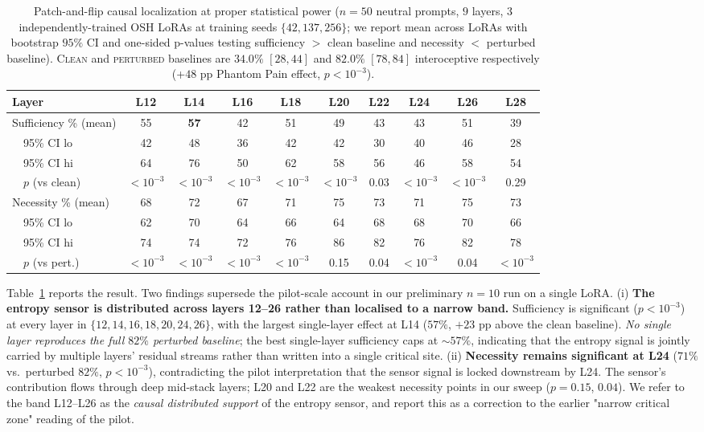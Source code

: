 \documentclass[10pt,letterpaper]{article}
\theoremstyle{definition}
\theoremstyle{plain}
\newcommand{\osh}{\textsc{OSH}}
\begin{document}
\begin{table}[t]
\centering
\caption{Patch-and-flip causal localization at proper statistical power
($n{=}50$ neutral prompts, $9$ layers, $3$ independently-trained
\osh{} LoRAs at training seeds $\{42, 137, 256\}$; we report mean across
LoRAs with bootstrap $95\%$ CI and one-sided p-values testing
sufficiency $>$ clean baseline and necessity $<$ perturbed baseline).
\textsc{Clean} and \textsc{perturbed} baselines are
$34.0\%$ $[28, 44]$ and $82.0\%$ $[78, 84]$ interoceptive
respectively (+$48$ pp Phantom Pain effect, $p < 10^{-3}$).}
\label{tab:patch-flip}
\small
\begin{tabular}{lccccccccc}
\toprule
\textbf{Layer} & L12 & L14 & L16 & L18 & L20 & L22 & L24 & L26 & L28 \\
\midrule
Sufficiency \% (mean)    & 55  & \textbf{57} & 42  & 51  & 49  & 43  & 43  & 51  & 39 \\
$\quad$95\% CI lo  & 42  & 48  & 36  & 42  & 42  & 30  & 40  & 46  & 28 \\
$\quad$95\% CI hi  & 64  & 76  & 50  & 62  & 58  & 56  & 46  & 58  & 54 \\
$\quad$$p$ (vs clean)    & ${<}10^{-3}$ & ${<}10^{-3}$ & ${<}10^{-3}$ & ${<}10^{-3}$ & ${<}10^{-3}$ & 0.03 & ${<}10^{-3}$ & ${<}10^{-3}$ & 0.29 \\
\midrule
Necessity \% (mean)      & 68  & 72  & 67  & 71  & 75  & 73  & 71  & 75  & 73 \\
$\quad$95\% CI lo  & 62  & 70  & 64  & 66  & 64  & 68  & 68  & 70  & 66 \\
$\quad$95\% CI hi  & 74  & 74  & 72  & 76  & 86  & 82  & 76  & 82  & 78 \\
$\quad$$p$ (vs pert.)    & ${<}10^{-3}$ & ${<}10^{-3}$ & ${<}10^{-3}$ & ${<}10^{-3}$ & 0.15 & 0.04 & ${<}10^{-3}$ & 0.04 & ${<}10^{-3}$ \\
\bottomrule
\end{tabular}
\end{table}

Table~\ref{tab:patch-flip} reports the result. Two findings supersede
the pilot-scale account in our preliminary $n{=}10$ run on a single
LoRA. (i) \textbf{The entropy sensor is distributed across layers
12--26 rather than localised to a narrow band.} Sufficiency is
significant ($p < 10^{-3}$) at every layer in $\{12, 14, 16, 18, 20, 24,
26\}$, with the largest single-layer effect at L14 ($57\%$, $+23$ pp
above the clean baseline). \emph{No single layer reproduces the full
$82\%$ perturbed baseline}; the best single-layer sufficiency caps at
$\sim$$57\%$, indicating that the entropy signal is jointly carried by
multiple layers' residual streams rather than written into a single
critical site. (ii) \textbf{Necessity remains significant at L24} ($71\%$
vs.\ perturbed $82\%$, $p < 10^{-3}$), contradicting the pilot
interpretation that the sensor signal is locked downstream by L24. The
sensor's contribution flows through deep mid-stack layers; L20 and L22
are the weakest necessity points in our sweep ($p = 0.15$, $0.04$).
We refer to the band L12--L26 as the \emph{causal distributed support}
of the entropy sensor, and report this as a correction to the earlier
"narrow critical zone" reading of the pilot.
\end{document}

